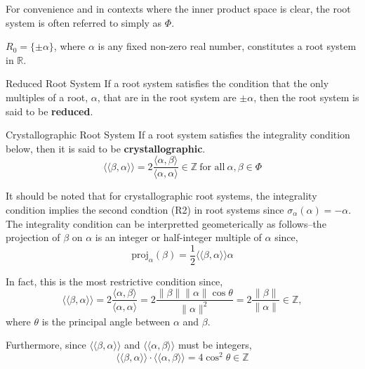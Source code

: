 For convenience and in contexts where the inner product space is clear, the root system is often referred to simply as $\Phi$.

\begin{example}
    $R_0 = \{\pm \alpha\}$, where $\alpha$ is any fixed non-zero real number, constitutes a root system in $\mathbb{R}$.
\end{example}

\begin{nameddefinition}{Reduced Root System}
    If a root system satisfies the condition that the only multiples of a root, $\alpha$, that are in the root system are $\pm \alpha$, then the root system is said to be \textbf{reduced}.
\end{nameddefinition}

\begin{nameddefinition}{Crystallographic Root System}
    If a root system satisfies the integrality condition below, then it is said to be \textbf{crystallographic}.
    \begin{equation*}
        \langle \langle \beta, \alpha \rangle \rangle = 2 \frac{ \langle \alpha, \beta \rangle}{\langle \alpha, \alpha \rangle} \in \mathbb{Z} \ \text{for all} \ \alpha, \beta \in \Phi
    \end{equation*}
\end{nameddefinition}

It should be noted that for crystallographic root systems, the integrality condition implies the second condtion (R2) in root systems since $\sigma_{\alpha}(\alpha) = -\alpha$.
The integrality condition can be interpretted geometerically as follows--the projection of $\beta$ on $\alpha$ is an integer or half-integer multiple of $\alpha$ since,
\begin{equation*}
    \text{proj}_{\alpha}(\beta) = \frac{1}{2} \langle \langle \beta, \alpha \rangle \rangle \alpha
\end{equation*}

In fact, this is the most restrictive condition since,
\begin{equation*}
    \langle \langle \beta, \alpha \rangle \rangle 
    =  2 \frac{ \langle \alpha, \beta \rangle}{\langle \alpha, \alpha \rangle}
    = 2 \frac{\|\beta\| \|\alpha\| \cos\theta }{\|\alpha\|^2}
    = 2 \frac{\|\beta\|}{\|\alpha\|} \in \mathbb{Z},
\end{equation*}
where $\theta$ is the principal angle between $\alpha$ and $\beta$.

Furthermore, since $\langle \langle \beta, \alpha \rangle \rangle$ and $\langle \langle \alpha, \beta \rangle \rangle$ must be integers,
\begin{equation*}
    \langle \langle \beta, \alpha \rangle \rangle \cdot \langle \langle \alpha, \beta \rangle \rangle = 4 \cos^2 \theta \in \mathbb{Z}
\end{equation*}

